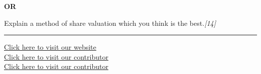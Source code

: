 \documentclass[11pt,a4paper]{article}
\newcommand{\pts}[1]{\hfill   \textit{[#1]}}
\begin{document}
\centerline{   \textbf{OR}}

Explain a method of share valuation which you think is the best.\pts{14}

\vfill
\rule{\linewidth}{0.4pt}

\begin{center}\small
\href{https://bhu-exam.vercel.app/}{Click here to visit our website}\\[4pt]
\href{https://me-aryan.vercel.app/}{Click here to visit our contributor}\\[4pt]
\href{https://quashan-me.vercel.app/}{Click here to visit our contributor}
\end{center}
\end{document}
